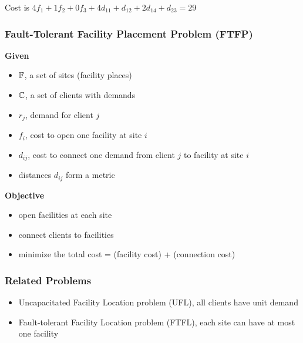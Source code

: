 \documentclass[handout, hyperref, dvipsnames]{beamer}
\begin{document}
\begin{frame}
\begin{figure}
{
  }
  \end{figure}

  Cost is $4f_1 + 1f_2 + 0f_3 + 4d_{11} + d_{12} + 2d_{14} +
  d_{23} = 29$
\end{frame}
\begin{frame}
  \frametitle{Fault-Tolerant Facility Placement Problem (FTFP)}
  \textbf{Given}
  \begin{itemize}
  \item $\mathbb{F}$, a set of sites (facility places)
  \item $\mathbb{C}$, a set of clients with demands
  \item $r_j$, demand for client $j$
  \item $f_i$, cost to open one facility at site $i$
  \item $d_{ij}$, cost to connect one demand from client $j$ to
    facility at site $i$
  \item distances $d_{ij}$ form a metric
  \end{itemize}

  \textbf{Objective}
  \begin{itemize}
  \item open facilities at each site
  \item connect clients to facilities
  \item minimize the total cost = (facility cost) + (connection cost)
  \end{itemize}

\end{frame}

\begin{frame}
  \frametitle{Related Problems}
  \begin{center}
  \end{center}
  \begin{itemize}
  \item Uncapacitated Facility Location problem (UFL),
    all clients have unit demand
  \item Fault-tolerant Facility Location problem (FTFL),
    each site can have at most one facility
  \end{itemize}
\end{frame}
\end{document}
